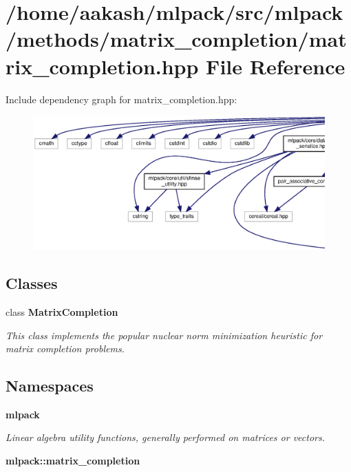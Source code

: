 \section{/home/aakash/mlpack/src/mlpack/methods/matrix\+\_\+completion/matrix\+\_\+completion.hpp File Reference}
\label{matrix__completion_8hpp}
Include dependency graph for matrix\+\_\+completion.\+hpp\+:
\nopagebreak
\begin{figure}[H]
\begin{center}
\leavevmode
\includegraphics[width=350pt]{matrix__completion_8hpp__incl}
\end{center}
\end{figure}
\subsection*{Classes}
\begin{DoxyCompactItemize}
\item 
class \textbf{ Matrix\+Completion}
\begin{DoxyCompactList}\small\item\em This class implements the popular nuclear norm minimization heuristic for matrix completion problems. \end{DoxyCompactList}\end{DoxyCompactItemize}
\subsection*{Namespaces}
\begin{DoxyCompactItemize}
\item 
 \textbf{ mlpack}
\begin{DoxyCompactList}\small\item\em Linear algebra utility functions, generally performed on matrices or vectors. \end{DoxyCompactList}\item 
 \textbf{ mlpack\+::matrix\+\_\+completion}
\end{DoxyCompactItemize}



